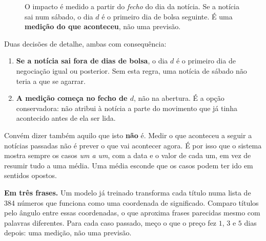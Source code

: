 \begin{figure}[ht]
\centering
{}
\caption[Como se mede o impacto de uma notícia]{O impacto é medido a partir do \emph{fecho} do dia da
notícia. Se a notícia sai num sábado, o dia $d$ é o primeiro dia de bolsa seguinte. É uma
\textbf{medição do que aconteceu}, não uma previsão.}
\label{fig:estudo_evento}
\end{figure}

Duas decisões de detalhe, ambas com consequência:

\begin{enumerate}
  \item \textbf{Se a notícia sai fora de dias de bolsa}, o dia $d$ é o primeiro dia de negociação
        igual ou posterior. Sem esta regra, uma notícia de sábado não teria a que se agarrar.
  \item \textbf{A medição começa no fecho de $d$}, não na abertura. É a opção conservadora: não
        atribui à notícia a parte do movimento que já tinha acontecido antes de ela ser lida.
\end{enumerate}

Convém dizer também aquilo que isto \textbf{não} é. Medir o que aconteceu a seguir a notícias
passadas não é prever o que vai acontecer agora. É por isso que o sistema mostra sempre os casos
\emph{um a um}, com a data e o valor de cada um, em vez de resumir tudo a uma média. Uma média
esconde que os casos podem ter ido em sentidos opostos.

\begin{tcolorbox}[colback=black!3, colframe=black!30, boxrule=0.4pt, arc=2pt]
\textbf{Em três frases.} Um modelo já treinado transforma cada título numa lista de 384 números que
funciona como uma coordenada de significado. Comparo títulos pelo ângulo entre essas coordenadas,
o que aproxima frases parecidas mesmo com palavras diferentes. Para cada caso passado, meço o que o
preço fez $1$, $3$ e $5$ dias depois: uma medição, não uma previsão.
\end{tcolorbox}

